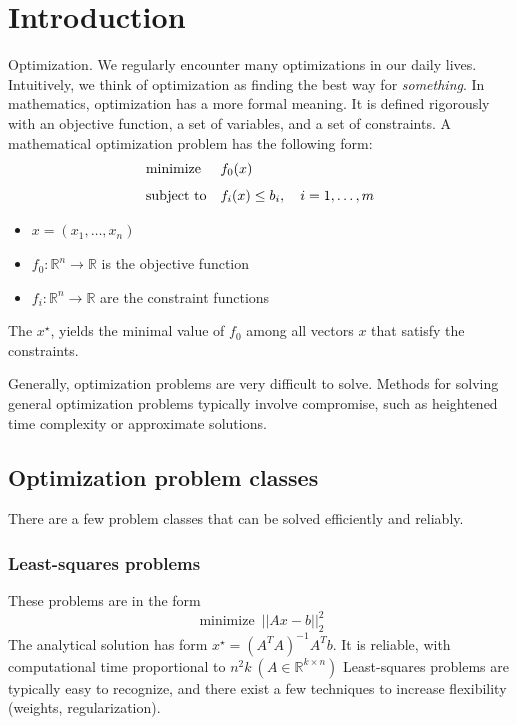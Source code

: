 
\chapter{Introduction}


Optimization. We regularly encounter many optimizations in our daily lives. Intuitively, we think of optimization as finding the best way for \textit{something}. In mathematics, optimization has a more formal meaning. It is defined rigorously with an objective function, a set of variables, and a set of constraints. A mathematical optimization problem has the following form:
\[
    \begin{aligned} & \underset{}{\operatorname{minimize}} & & f_0(x) \\ & \text{subject to} & & \begin{aligned}[t] f_i(x) \leq b_i, \quad i=1,\dots,m \end{aligned} \end{aligned}
\]

\begin{itemize}
    \item $x=(x_1, \dots, x_n)$
    \item $f_0: \mathbb{R}^n \to \mathbb{R}$ is the objective function
    \item $f_i: \mathbb{R}^n \to \mathbb{R}$ are the constraint functions
\end{itemize}

The  $x^\star$, yields the minimal value of $f_0$ among all vectors $x$ that satisfy the constraints.

Generally, optimization problems are very difficult to solve. Methods for solving general optimization problems typically involve 
compromise, such as heightened time complexity or approximate solutions. 


\section{Optimization problem classes}
There are a few problem classes that can be solved efficiently and reliably.


\subsection{Least-squares problems}
These problems are in the form
\[
    \operatorname{minimize} ~ ||Ax - b||^2_2
\] 
The analytical solution has form $x^\star = (A^T A)^{-1} A^T b$. It is reliable, with computational time proportional to $n^2 k ~ (A \in \mathbb{R}^{k \times n})$
Least-squares problems are typically easy to recognize, and there exist a few techniques to increase flexibility (weights, regularization).



